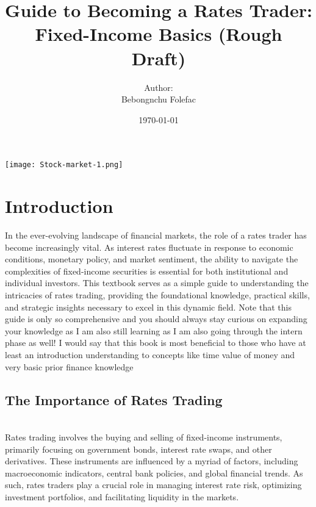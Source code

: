 \documentclass{article}
\title{Guide to Becoming a Rates Trader: Fixed-Income Basics (Rough Draft)}
\author{Author: \\ Bebongnchu Folefac}
\date{\today}
\begin{document}
\maketitle
\begin{center}
    \texttt{[image: Stock-market-1.png]} %

\end{center}

\newpage
\tableofcontents
\newpage


\section{Introduction}
\newpage
\hspace{2em}
In the ever-evolving landscape of financial markets, the role of a rates trader has become increasingly vital. As interest rates fluctuate in response to economic conditions, monetary policy, and market sentiment, the ability to navigate the complexities of fixed-income securities is essential for both institutional and individual investors. This textbook serves as a simple guide to understanding the intricacies of rates trading, providing the foundational knowledge, practical skills, and strategic insights necessary to excel in this dynamic field. Note that this guide is only so comprehensive and you should always stay curious on expanding your knowledge as I am also still learning as I am also going through the intern phase as well! I would say that this book is most beneficial to those who have at least an introduction understanding to concepts like time value of money and very basic prior finance knowledge

\subsection{The Importance of Rates Trading} \\

\hspace{2em}
Rates trading involves the buying and selling of fixed-income instruments, primarily focusing on government bonds, interest rate swaps, and other derivatives. These instruments are influenced by a myriad of factors, including macroeconomic indicators, central bank policies, and global financial trends. As such, rates traders play a crucial role in managing interest rate risk, optimizing investment portfolios, and facilitating liquidity in the markets.\\
\end{document}
